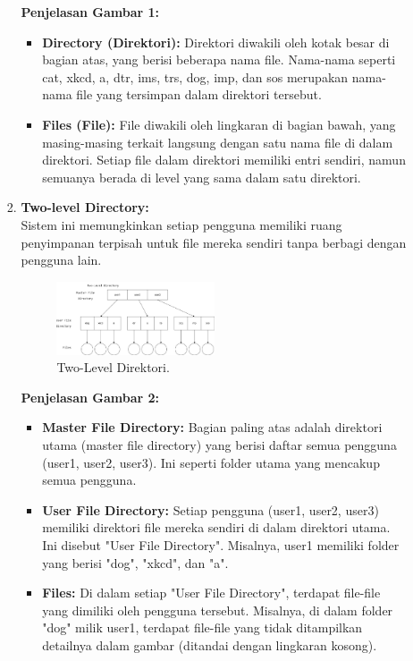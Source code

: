 \documentclass[12pt]{article}
\begin{document}
\begin{itemize}
\begin{enumerate}
\begin{enumerate}[label=\alph*.]
        \textbf{Penjelasan Gambar 1:}
        \begin{itemize}
            \item \textbf{Directory (Direktori):} Direktori diwakili oleh kotak besar di bagian atas, yang berisi beberapa nama file. Nama-nama seperti cat, xkcd, a, dtr, ims, trs, dog, imp, dan sos merupakan nama-nama file yang tersimpan dalam direktori tersebut.
            \item \textbf{Files (File):} File diwakili oleh lingkaran di bagian bawah, yang masing-masing terkait langsung dengan satu nama file di dalam direktori. Setiap file dalam direktori memiliki entri sendiri, namun semuanya berada di level yang sama dalam satu direktori.
        \end{itemize}

         \item \textbf{Two-level Directory:} \\
        Sistem ini memungkinkan setiap pengguna memiliki ruang penyimpanan terpisah untuk file mereka sendiri tanpa berbagi dengan pengguna lain.

        \begin{figure}[h]
        \centering
        \includegraphics[width=0.5\textwidth]{assets/gambar2.jpg}
        \caption{Two-Level Direktori.}
        \label{fig:two-level-direktori}
        \end{figure}

        \textbf{Penjelasan Gambar 2:}
        \begin{itemize}
            \item \textbf{Master File Directory:} Bagian paling atas adalah direktori utama (master file directory) yang berisi daftar semua pengguna (user1, user2, user3). Ini seperti folder utama yang mencakup semua pengguna.
            \item \textbf{User File Directory:} Setiap pengguna (user1, user2, user3) memiliki direktori file mereka sendiri di dalam direktori utama. Ini disebut "User File Directory". Misalnya, user1 memiliki folder yang berisi "dog", "xkcd", dan "a".
            \item \textbf{Files:} Di dalam setiap "User File Directory", terdapat file-file yang dimiliki oleh pengguna tersebut. Misalnya, di dalam folder "dog" milik user1, terdapat file-file yang tidak ditampilkan detailnya dalam gambar (ditandai dengan lingkaran kosong).
        \end{itemize}


\end{enumerate}
\end{enumerate}
\end{itemize}
\end{document}
